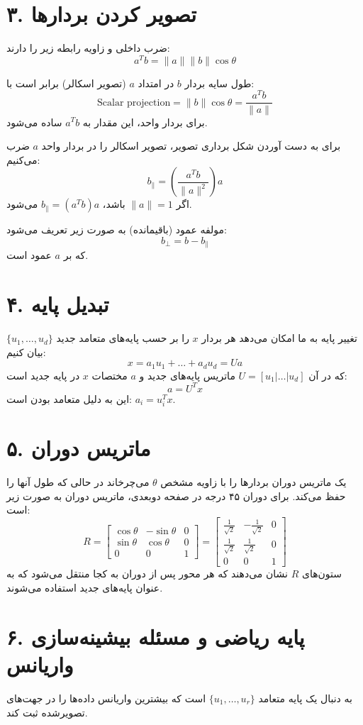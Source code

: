 \documentclass{article}
\begin{document}
\section*{۳. تصویر کردن بردارها}
ضرب داخلی و زاویه رابطه زیر را دارند:
\[
a^T b = \|a\| \|b\| \cos\theta
\]

طول سایه بردار $b$ در امتداد $a$ (تصویر اسکالر) برابر است با:
\[
\text{Scalar projection} = \|b\| \cos\theta = \frac{a^T b}{\|a\|}
\]
برای بردار واحد، این مقدار به $a^T b$ ساده می‌شود.

برای به دست آوردن شکل برداری تصویر، تصویر اسکالر را در بردار واحد $a$ ضرب می‌کنیم:
\[
b_{\parallel} = \left( \frac{a^T b}{\|a\|^2} \right) a
\]
اگر $\|a\|=1$ باشد، $b_{\parallel} = (a^T b) a$ می‌شود.

مولفه عمود (باقیمانده) به صورت زیر تعریف می‌شود:
\[
b_{\perp} = b - b_{\parallel}
\]
که بر $a$ عمود است.

\section*{۴. تبدیل پایه}
تغییر پایه به ما امکان می‌دهد هر بردار $x$ را بر حسب پایه‌های متعامد جدید $\{u_1, \dots, u_d\}$ بیان کنیم:
\[
x = a_1 u_1 + \dots + a_d u_d = U a
\]
که در آن $U = [u_1 | \dots | u_d]$ ماتریس پایه‌های جدید و $a$ مختصات $x$ در پایه جدید است:
\[
a = U^T x
\]
این به دلیل متعامد بودن است: $a_i = u_i^T x$.

\section*{۵. ماتریس دوران}
یک ماتریس دوران بردارها را با زاویه مشخص $\theta$ می‌چرخاند در حالی که طول آنها را حفظ می‌کند. برای دوران ۴۵ درجه در صفحه دو‌بعدی، ماتریس دوران به صورت زیر است:
\[
R = \begin{bmatrix} \cos\theta & -\sin\theta & 0 \\ \sin\theta & \cos\theta & 0 \\ 0 & 0 & 1 \end{bmatrix} = \begin{bmatrix} \frac{1}{\sqrt{2}} & -\frac{1}{\sqrt{2}} & 0 \\ \frac{1}{\sqrt{2}} & \frac{1}{\sqrt{2}} & 0 \\ 0 & 0 & 1 \end{bmatrix}
\]
ستون‌های $R$ نشان می‌دهند که هر محور پس از دوران به کجا منتقل می‌شود که به عنوان پایه‌های جدید استفاده می‌شوند.

\section*{۶. پایه ریاضی  و مسئله بیشینه‌سازی واریانس}
 به دنبال یک پایه متعامد $\{u_1, \dots, u_r\}$ است که بیشترین واریانس داده‌ها را در جهت‌های تصویرشده ثبت کند.
\end{document}

